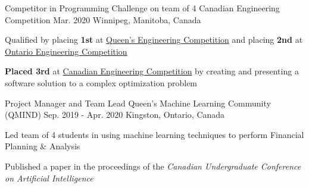 
\begin{cventries}

  \cventry
    {Competitor in Programming Challenge on team of 4} %
    {Canadian Engineering Competition} %
    {Mar. 2020} %
    {Winnipeg, Manitoba, Canada} %
    {
      \begin{cvitems} %
        \item{Qualified by placing \textbf{1st} at \href{https://quengcomp.ca/}{Queen's Engineering Competition} and placing \textbf{2nd} at \href{https://www.oec2020.ca/}{Ontario Engineering Competition}}
        \item{\textbf{Placed 3rd} at \href{https://cfes.ca/cec/}{Canadian Engineering Competition} by creating and presenting a software solution to a complex optimization problem}
      \end{cvitems}
    }


  \cventry
    {Project Manager and Team Lead} %
    {Queen's Machine Learning Community (QMIND)} %
    {Sep. 2019 - Apr. 2020} %
    {Kingston, Ontario, Canada} %
    {
      \begin{cvitems} %
        \item{Led team of 4 students in using machine learning techniques to perform Financial Planning \& Analysis}
        \item{Published a paper in the proceedings of the \textit{Canadian Undergraduate Conference on Artificial Intelligence}}
      \end{cvitems}
    }


\end{cventries}
